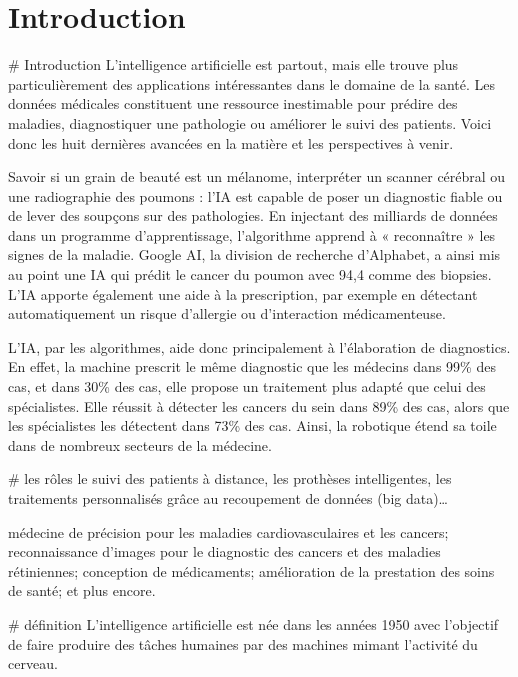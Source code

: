 \section{Introduction}

# Introduction
L’intelligence artificielle est partout, mais elle trouve plus particulièrement
des applications intéressantes dans le domaine de la santé. Les données
médicales constituent une ressource inestimable pour prédire des maladies,
diagnostiquer une pathologie ou améliorer le suivi des patients. Voici donc les
huit dernières avancées en la matière et les perspectives à venir.

Savoir si un grain de beauté est un mélanome, interpréter un scanner cérébral
ou une radiographie des poumons : l'IA est capable de poser un diagnostic
fiable ou de lever des soupçons sur des pathologies. En injectant des milliards
de données dans un programme d'apprentissage, l'algorithme  apprend à «
reconnaître » les signes de la maladie. Google AI, la division de recherche
d'Alphabet, a ainsi mis au point une IA qui prédit le cancer du poumon avec
94,4 %
comme des biopsies. L'IA apporte également une aide à la prescription, par
exemple en détectant automatiquement un risque d'allergie ou d’interaction
médicamenteuse.



L’IA, par les algorithmes, aide donc principalement à l’élaboration de
diagnostics. En effet, la machine prescrit le même diagnostic que les médecins
dans 99\% des cas, et dans 30\% des cas, elle propose un traitement plus adapté
que celui des spécialistes. Elle réussit à détecter les cancers du sein dans
89\% des cas, alors que les spécialistes les détectent dans 73\% des cas. 
Ainsi, la robotique étend sa toile dans de nombreux secteurs de la médecine.

# les rôles
le suivi des patients à distance,
les prothèses intelligentes,
les traitements personnalisés grâce au recoupement de données (big data)… 

médecine de précision pour les maladies cardiovasculaires et les cancers;
reconnaissance d’images pour le diagnostic des cancers et des maladies rétiniennes;
conception de médicaments;
amélioration de la prestation des soins de santé;
et plus encore.


# définition 
L’intelligence artificielle est née dans les années 1950 avec l’objectif de
faire produire des tâches humaines par des machines mimant l’activité du
cerveau.

